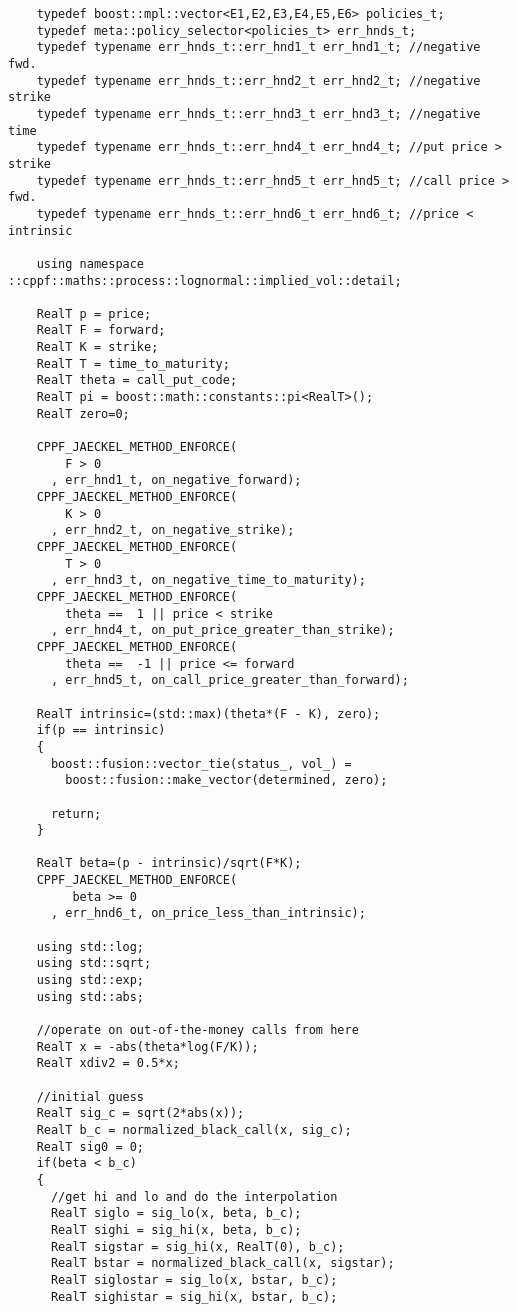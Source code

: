 \documentclass[a4paper,twoside,twocolumn]{article}
\begin{document}
\begin{verbatim}
    typedef boost::mpl::vector<E1,E2,E3,E4,E5,E6> policies_t;
    typedef meta::policy_selector<policies_t> err_hnds_t;
    typedef typename err_hnds_t::err_hnd1_t err_hnd1_t; //negative fwd.
    typedef typename err_hnds_t::err_hnd2_t err_hnd2_t; //negative strike
    typedef typename err_hnds_t::err_hnd3_t err_hnd3_t; //negative time
    typedef typename err_hnds_t::err_hnd4_t err_hnd4_t; //put price > strike
    typedef typename err_hnds_t::err_hnd5_t err_hnd5_t; //call price > fwd.
    typedef typename err_hnds_t::err_hnd6_t err_hnd6_t; //price < intrinsic
    
    using namespace ::cppf::maths::process::lognormal::implied_vol::detail;
          
    RealT p = price;
    RealT F = forward;
    RealT K = strike;
    RealT T = time_to_maturity;
    RealT theta = call_put_code;
    RealT pi = boost::math::constants::pi<RealT>();
    RealT zero=0;

    CPPF_JAECKEL_METHOD_ENFORCE(
        F > 0
      , err_hnd1_t, on_negative_forward);
    CPPF_JAECKEL_METHOD_ENFORCE(
        K > 0
      , err_hnd2_t, on_negative_strike);
    CPPF_JAECKEL_METHOD_ENFORCE(
        T > 0
      , err_hnd3_t, on_negative_time_to_maturity);
    CPPF_JAECKEL_METHOD_ENFORCE(
        theta ==  1 || price < strike
      , err_hnd4_t, on_put_price_greater_than_strike);
    CPPF_JAECKEL_METHOD_ENFORCE(
        theta ==  -1 || price <= forward
      , err_hnd5_t, on_call_price_greater_than_forward);

    RealT intrinsic=(std::max)(theta*(F - K), zero);
    if(p == intrinsic)
    {
      boost::fusion::vector_tie(status_, vol_) =
        boost::fusion::make_vector(determined, zero);

      return;
    }

    RealT beta=(p - intrinsic)/sqrt(F*K);
    CPPF_JAECKEL_METHOD_ENFORCE(
         beta >= 0
      , err_hnd6_t, on_price_less_than_intrinsic);

    using std::log;
    using std::sqrt;
    using std::exp;
    using std::abs;

    //operate on out-of-the-money calls from here
    RealT x = -abs(theta*log(F/K));
    RealT xdiv2 = 0.5*x;

    //initial guess
    RealT sig_c = sqrt(2*abs(x));
    RealT b_c = normalized_black_call(x, sig_c);
    RealT sig0 = 0;
    if(beta < b_c)
    {
      //get hi and lo and do the interpolation
      RealT siglo = sig_lo(x, beta, b_c);
      RealT sighi = sig_hi(x, beta, b_c);
      RealT sigstar = sig_hi(x, RealT(0), b_c);
      RealT bstar = normalized_black_call(x, sigstar);
      RealT siglostar = sig_lo(x, bstar, b_c);
      RealT sighistar = sig_hi(x, bstar, b_c);


\end{verbatim}
\end{document}

